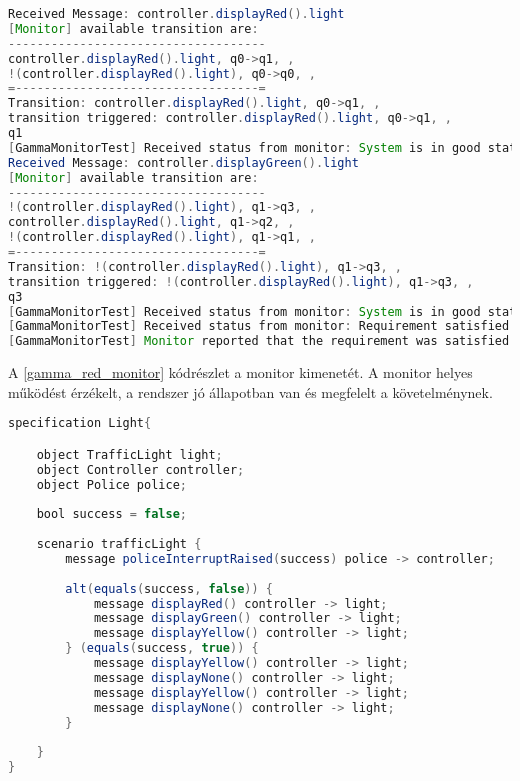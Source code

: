 \begin{lstlisting}[language=java, frame=single, float=ht!, caption={Monitor kimenete.},captionpos=b,label=gamma_red_monitor]
Received Message: controller.displayRed().light
[Monitor] available transition are: 
------------------------------------
controller.displayRed().light, q0->q1, , 
!(controller.displayRed().light), q0->q0, , 
=----------------------------------=
Transition: controller.displayRed().light, q0->q1, , 
transition triggered: controller.displayRed().light, q0->q1, , 
q1
[GammaMonitorTest] Received status from monitor: System is in good state.
Received Message: controller.displayGreen().light
[Monitor] available transition are: 
------------------------------------
!(controller.displayRed().light), q1->q3, , 
controller.displayRed().light, q1->q2, , 
!(controller.displayRed().light), q1->q1, , 
=----------------------------------=
Transition: !(controller.displayRed().light), q1->q3, , 
transition triggered: !(controller.displayRed().light), q1->q3, , 
q3
[GammaMonitorTest] Received status from monitor: System is in good state.
[GammaMonitorTest] Received status from monitor: Requirement satisfied
[GammaMonitorTest] Monitor reported that the requirement was satisfied
\end{lstlisting}

A \ref{gamma_red_monitor} kódrészlet a monitor kimenetét.
A monitor helyes működést érzékelt, a rendszer jó állapotban van és megfelelt a követelménynek.

\begin{lstlisting}[language=java, frame=single, float=ht!, caption={Szenárió szöveges leírása.},captionpos=b,label=gamma_complex_scenario]
specification Light{

    object TrafficLight light;
    object Controller controller;
    object Police police;
    
    bool success = false;
    
    scenario trafficLight {
        message policeInterruptRaised(success) police -> controller;
        
        alt(equals(success, false)) {
            message displayRed() controller -> light;
            message displayGreen() controller -> light;
            message displayYellow() controller -> light;
        } (equals(success, true)) {
            message displayYellow() controller -> light;
            message displayNone() controller -> light;
            message displayYellow() controller -> light;
            message displayNone() controller -> light;
        }
        
    }
}
\end{lstlisting}

